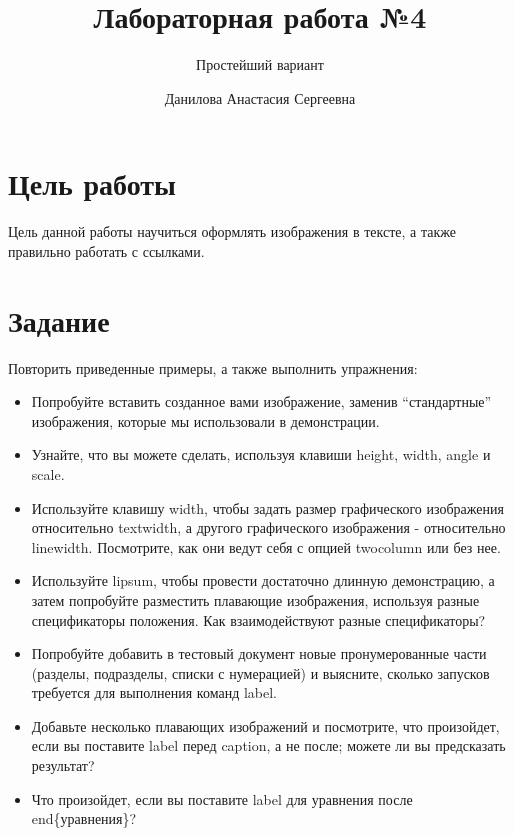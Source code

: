 \documentclass[
  english,
  russian,
  12pt,
  a4paper,
  DIV=11,
  numbers=noendperiod]{scrreprt}
\title{Лабораторная работа №4}
\subtitle{Простейший вариант}
\author{Данилова Анастасия Сергеевна}
\date{}
\providecommand{\tightlist}{%
  \setlength{\itemsep}{0pt}\setlength{\parskip}{0pt}}
\renewcommand*\contentsname{Содержание}
\newcommand\contentsname{Содержание}
\begin{document}
\maketitle

\renewcommand*\contentsname{Содержание}
{
\setcounter{tocdepth}{1}
\tableofcontents
}
\listoffigures
\listoftables

\chapter{Цель
работы}\label{ux446ux435ux43bux44c-ux440ux430ux431ux43eux442ux44b}

Цель данной работы научиться оформлять изображения в тексте, а также
правильно работать с ссылками.

\chapter{Задание}\label{ux437ux430ux434ux430ux43dux438ux435}

Повторить приведенные примеры, а также выполнить упражнения:

\begin{itemize}
\tightlist
\item
  Попробуйте вставить созданное вами изображение, заменив
  \enquote{стандартные} изображения, которые мы использовали в
  демонстрации.
\item
  Узнайте, что вы можете сделать, используя клавиши height, width, angle
  и scale.
\item
  Используйте клавишу width, чтобы задать размер графического
  изображения относительно textwidth, а другого графического изображения
  - относительно linewidth. Посмотрите, как они ведут себя с опцией
  twocolumn или без нее.
\item
  Используйте lipsum, чтобы провести достаточно длинную демонстрацию, а
  затем попробуйте разместить плавающие изображения, используя разные
  спецификаторы положения. Как взаимодействуют разные спецификаторы?
\item
  Попробуйте добавить в тестовый документ новые пронумерованные части
  (разделы, подразделы, списки с нумерацией) и выясните, сколько
  запусков требуется для выполнения команд label.
\item
  Добавьте несколько плавающих изображений и посмотрите, что произойдет,
  если вы поставите label перед caption, а не после; можете ли вы
  предсказать результат?
\item
  Что произойдет, если вы поставите label для уравнения после
  end\{уравнения\}?
\end{itemize}
\end{document}
